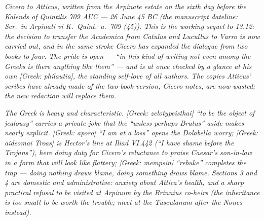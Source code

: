 
\textit{Cicero to Atticus, written from the Arpinate
estate on the sixth day before the Kalends of
Quintilis 709 AUC --- 26 June 45 BC (the manuscript
dateline: \textit{Scr.\ in Arpinati vi K.\ Quint.\
a.\ 709 (45)}). This is the working sequel to 13.12:
the decision to transfer the \textit{Academica} from
Catulus and Lucullus to Varro is now carried out, and
in the same stroke Cicero has expanded the dialogue
from two books to four. The pride is open --- ``in
this kind of writing not even among the Greeks is
there anything like them'' --- and is at once
checked by a glance at his own \textit{[Greek:
philautia]}, the standing self-love of all authors.
The copies Atticus' scribes have already made of the
two-book version, Cicero notes, are now wasted; the
new redaction will replace them.}

\textit{The Greek is heavy and characteristic.
\textit{[Greek: zelotypeisthai]} ``to be the object
of jealousy'' carries a private joke that the
``unless perhaps Brutus'' aside makes nearly
explicit. \textit{[Greek: aporo]} ``I am at a loss''
opens the Dolabella worry; \textit{[Greek: aideomai
Troas]} is Hector's line at \textit{Iliad} VI.442
(``I have shame before the Trojans''), here doing
duty for Cicero's reluctance to praise Caesar's
son-in-law in a form that will look like flattery;
\textit{[Greek: mempsin]} ``rebuke'' completes the
trap --- doing nothing draws blame, doing something
draws blame. Sections 3 and 4 are domestic and
administrative: anxiety about Attica's health, and a
sharp practical refusal to be visited at Arpinum by
the Brinnius co-heirs (the inheritance is too small
to be worth the trouble; meet at the Tusculanum
after the Nones instead).}
